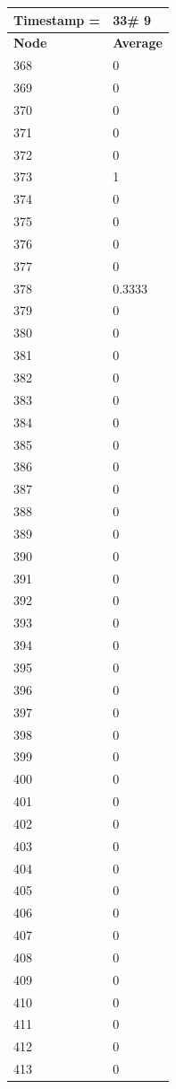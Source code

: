 \begin{tabular}{|l||l|}
\hline
\textbf{Timestamp =} & \textbf{33}\# 9\\\hline
	\textbf{Node} & \textbf{Average} \\ \hline
\hline
	368 & 0 \\ \hline
	369 & 0 \\ \hline
	370 & 0 \\ \hline
	371 & 0 \\ \hline
	372 & 0 \\ \hline
	373 & 1 \\ \hline
	374 & 0 \\ \hline
	375 & 0 \\ \hline
	376 & 0 \\ \hline
	377 & 0 \\ \hline
	378 & 0.3333 \\ \hline
	379 & 0 \\ \hline
	380 & 0 \\ \hline
	381 & 0 \\ \hline
	382 & 0 \\ \hline
	383 & 0 \\ \hline
	384 & 0 \\ \hline
	385 & 0 \\ \hline
	386 & 0 \\ \hline
	387 & 0 \\ \hline
	388 & 0 \\ \hline
	389 & 0 \\ \hline
	390 & 0 \\ \hline
	391 & 0 \\ \hline
	392 & 0 \\ \hline
	393 & 0 \\ \hline
	394 & 0 \\ \hline
	395 & 0 \\ \hline
	396 & 0 \\ \hline
	397 & 0 \\ \hline
	398 & 0 \\ \hline
	399 & 0 \\ \hline
	400 & 0 \\ \hline
	401 & 0 \\ \hline
	402 & 0 \\ \hline
	403 & 0 \\ \hline
	404 & 0 \\ \hline
	405 & 0 \\ \hline
	406 & 0 \\ \hline
	407 & 0 \\ \hline
	408 & 0 \\ \hline
	409 & 0 \\ \hline
	410 & 0 \\ \hline
	411 & 0 \\ \hline
	412 & 0 \\ \hline
	413 & 0 \\ \hline
\end{tabular}

